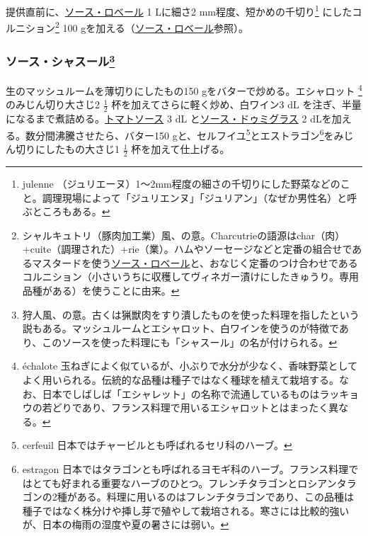 \begin{recette}
提供直前に、\protect\hyperlink{sauce-robert}{ソース・ロベール} 1
Lに細さ2 mm程度、短かめの千切り\footnote{julenne
  （ジュリエーヌ）1〜2mm程度の細さの千切りにした野菜などのこと。調理現場によって「ジュリエンヌ」「ジュリアン」（なぜか男性名）と呼ぶところもある。}
にしたコルニション\footnote{シャルキュトリ（豚肉加工業）風、の意。Charcutrieの語源はchar（肉）
  +cuite（調理された）+rie（業）。ハムやソーセージなどと定番の組合せであるマスタードを使う\protect\hyperlink{sauce-robert}{ソース・ロベール}と、おなじく定番のつけ合わせであるコルニション（小さいうちに収穫してヴィネガー漬けにしたきゅうり。専用品種がある）を使うことに由来。}
100
gを加える（\protect\hyperlink{sauce-robert}{ソース・ロベール}参照）。

\atoaki{}

\hypertarget{sauce-chasseur}{%
\subsubsection[ソース・シャスール]{\texorpdfstring{ソース・シャスール\footnote{狩人風、の意。古くは猟獣肉をすり潰したものを使った料理を指したという説もある。マッシュルームとエシャロット、白ワインを使うのが特徴であり、このソースを使った料理にも「シャスール」の名が付けられる。}}{ソース・シャスール}}\label{sauce-chasseur}}


 

生のマッシュルームを薄切りにしたもの150 gをバターで炒める。エシャロット
\footnote{échalote
  玉ねぎによく似ているが、小ぶりで水分が少なく、香味野菜としてよく用いられる。伝統的な品種は種子ではなく種球を植えて栽培する。なお、日本でしばしば「エシャレット」の名称で流通しているものはラッキョウの若どりであり、フランス料理で用いるエシャロットとはまったく異なる。}のみじん切り大さじ2
\(\frac{1}{2}\) 杯を加えてさらに軽く炒め、白ワイン3 dL
を注ぎ、半量になるまで煮詰める。\protect\hyperlink{sauce-tomate}{トマトソース}
3 dL と\protect\hyperlink{sauce-demi-glace}{ソース・ドゥミグラス} 2
dLを加える。数分間沸騰させたら、バター150 gと、セルフイユ\footnote{cerfeuil
  日本ではチャービルとも呼ばれるセリ科のハーブ。}とエストラゴン\footnote{estragon
  日本ではタラゴンとも呼ばれるヨモギ科のハーブ。フランス料理ではとても好まれる重要なハーブのひとつ。フレンチタラゴンとロシアンタラゴンの2種がある。料理に用いるのはフレンチタラゴンであり、この品種は種子ではなく株分けや挿し芽で殖やして栽培される。寒さには比較的強いが、日本の梅雨の湿度や夏の暑さには弱い。}をみじん切りにしたもの大さじ1
\(\frac{1}{2}\) 杯を加えて仕上げる。


\end{recette}
